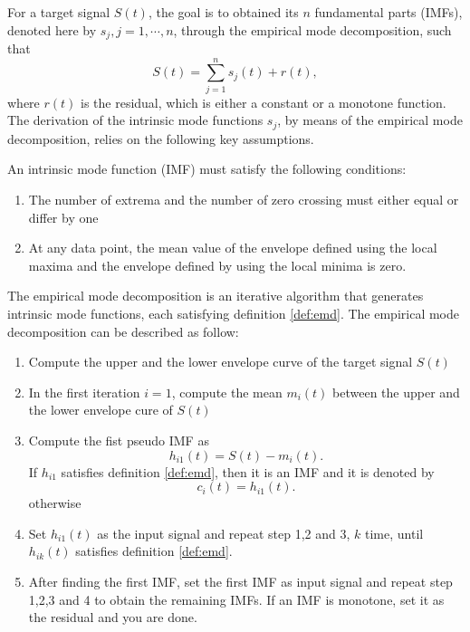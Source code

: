 \documentclass[../Main/thesis.tex]{subfiles}
\begin{document}
  For a target signal $S(t)$, the goal is to obtained its $n$ fundamental parts (IMFs), denoted here by $s_{j}, j =1,\cdots,n$, through the empirical mode decomposition, such that
\begin{equation}\label{eq:emd-decomposition}
S(t) = \sum_{j=1}^{n}s_{j}(t) + r(t),
\end{equation}
where $r(t)$ is the residual, which is either a constant or a monotone function. The derivation of the intrinsic mode functions $s_{j}$, by means of the empirical mode decomposition, relies on the following key assumptions.
\begin{definition}\label{def:emd}
An intrinsic mode function (IMF) must satisfy the following conditions:
\begin{enumerate}
\item The number of extrema and the number of zero crossing must either equal or differ by one 
\item At any data point, the mean value of the envelope defined using the local maxima and the envelope defined by using the local minima is zero.
\end{enumerate}
\end{definition}
The empirical mode decomposition is an iterative algorithm that generates intrinsic mode functions, each satisfying definition \ref{def:emd}.
\justify
The empirical mode decomposition can be described as follow:
\begin{enumerate}
	\item Compute the upper and the lower envelope curve of the target signal $S(t)$
	\item In the first iteration $i=1$, compute the mean $m_{i}(t)$ between the upper and the lower envelope cure of $S(t)$
	\item Compute the fist pseudo IMF as 
	\begin{equation}\label{eq:proto}
		h_{i1}(t) = S(t)-m_{i}(t).
	\end{equation}
	If $h_{i1}$ satisfies definition \ref{def:emd}, then it is an IMF and it is denoted by 
	\begin{equation}\label{eq:imf}
		c_{i}(t) = h_{i1}(t).
	\end{equation}
	otherwise
	
	\item Set $h_{i1}(t)$ as the input signal and repeat step 1,2 and 3, $k$ time, until $h_{ik}(t)$ satisfies definition \ref{def:emd}.
	\item After finding the first IMF, set the first IMF as input signal and repeat step 1,2,3 and 4 to obtain the remaining IMFs. If an IMF is monotone, set it as the residual and you are done.
\end{enumerate}
\end{document}
